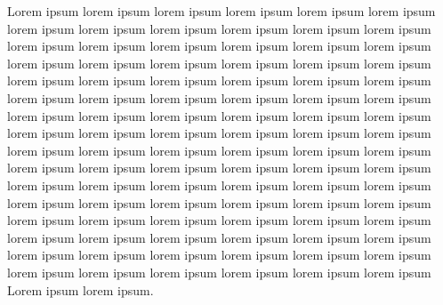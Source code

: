\documentclass[10pt,twocolumn]{article}
\begin{document}
Lorem ipsum lorem ipsum lorem ipsum lorem ipsum lorem ipsum lorem ipsum lorem
ipsum lorem ipsum lorem ipsum lorem ipsum lorem ipsum lorem ipsum lorem ipsum
lorem ipsum lorem ipsum lorem ipsum lorem ipsum lorem ipsum lorem ipsum lorem
ipsum lorem ipsum lorem ipsum lorem ipsum lorem ipsum lorem ipsum lorem ipsum
lorem ipsum lorem ipsum lorem ipsum lorem ipsum lorem ipsum lorem ipsum lorem
ipsum lorem ipsum lorem ipsum lorem ipsum lorem ipsum lorem ipsum lorem ipsum
lorem ipsum lorem ipsum lorem ipsum lorem ipsum lorem ipsum lorem ipsum lorem
ipsum lorem ipsum lorem ipsum lorem ipsum lorem ipsum lorem ipsum lorem ipsum
lorem ipsum lorem ipsum lorem ipsum lorem ipsum lorem ipsum lorem ipsum lorem
ipsum lorem ipsum lorem ipsum lorem ipsum lorem ipsum lorem ipsum lorem ipsum
lorem ipsum lorem ipsum lorem ipsum lorem ipsum lorem ipsum lorem ipsum lorem
ipsum lorem ipsum lorem ipsum lorem ipsum lorem ipsum lorem ipsum lorem ipsum
lorem ipsum lorem ipsum lorem ipsum lorem ipsum lorem ipsum lorem ipsum lorem
ipsum lorem ipsum lorem ipsum lorem ipsum lorem ipsum lorem ipsum lorem ipsum
lorem ipsum lorem ipsum lorem ipsum lorem ipsum lorem ipsum Lorem ipsum lorem
ipsum.
\end{document}
